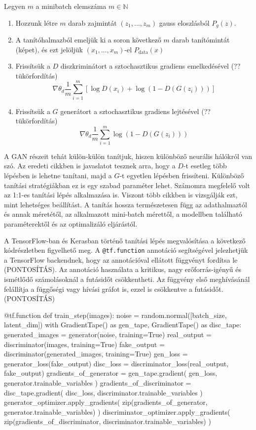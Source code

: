 Legyen $m$ a minibatch elemszáma $m \in \mathbb{N}$
\begin{enumerate}
\item Hozzunk létre $m$ darab zajmintát $(z_1, \ldots, z_m)$ gauss eloszlásból $P_g(z)$.
\item A tanítóhalmazból emeljük ki a soron következő $m$ darab tanítómintát (képet), és ezt jelöljük $(x_1, \ldots, x_m)$-el $P_{\text{data}}(x)$
\item Frissítsük a $D$ diszkriminátort a sztochasztikus gradiens emelkedésével (?? tükörfordítás)
$$ \nabla \theta_d \frac{1}{m} \sum_{i=1}^{m} \left[\log D(x_i) + \log(1 - D(G(z_i))) \right]$$
\item  Frissítsük a $G$ generátort a sztochasztikus gradiens lejtésével (?? tükörfordítás)
$$ \nabla \theta_d \frac{1}{m} \sum_{i=1}^{m} \log(1 - D(G(z_i)))$$
\end{enumerate}

A GAN részeit tehát külön-külön tanítjuk, hiszen különböző neurális hálókról van szó. Az eredeti cikkben is javaslatot tesznek arra, hogy a $D$-t esetleg több lépésben is lehetne tanítani, majd a $G$-t egyetlen lépésben frissíteni.
Különböző tanítási stratégiákban ez is egy szabad paraméter lehet. Számomra megfelelő volt az 1:1-es tanítási lépés alkalmazása is. Viszont több cikkben is vizsgálják ezt, mint lehetséges beállítást.
A tanítás hossza természetesen függ az adathalmaztól és annak méretétől, az alkalmazott mini-batch mérettől, a modellben található paraméterektől és az optimalizáló eljárástól.

A TensorFlow-ban és Kerasban történő tanítási lépés megvalósítása a következő kódrészletben figyelhető meg. A \texttt{@tf.function} annotáció segítségével jelezhetjük a TensorFlow backendnek, hogy az annotációval ellátott függvényt fordítsa le (PONTOSÍTÁS). Az annotáció használata a kritikus, nagy erőforrás-igényű és ismétlődő számolásoknál a futásidőt csökkentheti. Az függvény első meghívásánál felállítja a függőségi vagy hívási gráfot is, ezzel is csökkentve a futásidőt. (PONTOSÍTÁS)
\begin{python}
@tf.function
def train_step(images):
    noise = random.normal([batch_size, latent_dim])
    with GradientTape() as gen_tape, GradientTape() as disc_tape:
        generated_images = generator(noise, training=True)
        real_output = discriminator(images, training=True)
        fake_output = discriminator(generated_images, training=True)
        gen_loss = generator_loss(fake_output)
        disc_loss = discriminator_loss(real_output, fake_output)
    gradients_of_generator = gen_tape.gradient(
        gen_loss, generator.trainable_variables
    )
    gradients_of_discriminator = disc_tape.gradient(
        disc_loss, discriminator.trainable_variables
    )
    generator_optimizer.apply_gradients(
        zip(gradients_of_generator,
        generator.trainable_variables)
    )
    discriminator_optimizer.apply_gradients(
        zip(gradients_of_discriminator,
        discriminator.trainable_variables)
    )
\end{python}

